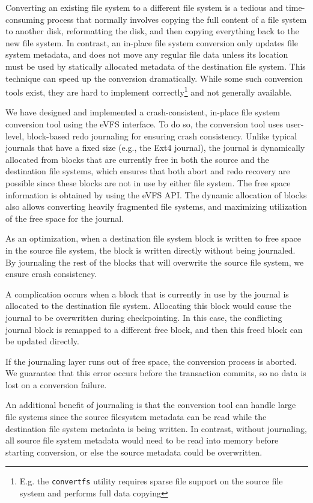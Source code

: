 Converting an existing file system to a different file system is a tedious and time-consuming process that normally involves copying the full content of a file system to another disk, reformatting the disk, and then copying everything back to the new file system. In contrast, an in-place file system conversion only updates file system metadata, and does not move any regular file data unless its location must be used by statically allocated metadata of the destination file system. This technique can speed up the conversion dramatically. While some such conversion tools exist, they are hard to implement correctly\footnote{E.g. the \texttt{convertfs} utility \cite{convertfs} requires sparse file support on the source file system and performs full data copying} and not generally available.

We have designed and implemented a crash-consistent, in-place file system conversion tool using the eVFS interface. To do so, the conversion tool uses user-level, block-based redo journaling for ensuring crash consistency. Unlike typical journals that have a fixed size (e.g., the Ext4 journal), the journal is dynamically allocated from blocks that are currently free in both the source and the destination file systems, which ensures that both abort and redo recovery are possible since these blocks are not in use by either file system. The free space information is obtained by using the eVFS API. The dynamic allocation of blocks also allows converting heavily fragmented file systems, and maximizing utilization of the free space for the journal.

As an optimization, when a destination file system block is written to free space in the source file system, the block is written directly without being journaled. By journaling the rest of the blocks that will overwrite the source file system, we ensure crash consistency.

A complication occurs when a block that is currently in use by the journal is allocated to the destination file system. Allocating this block would cause the journal to be overwritten during checkpointing. In this case, the conflicting journal block is remapped to a different free block, and then this freed block can be updated directly.

If the journaling layer runs out of free space, the conversion process is aborted. We guarantee that this error occurs before the transaction commits, so no data is lost on a conversion failure.

An additional benefit of journaling is that the conversion tool can handle large file systems since the source filesystem metadata can be read while the destination file system metadata is being written. In contrast, without journaling, all source file system metadata would need to be read into memory before starting conversion, or else the source metadata could be overwritten.

